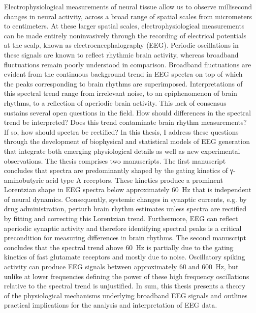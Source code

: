 \documentclass[11pt]{report}
\begin{document}
Electrophysiological measurements of neural tissue allow us to observe millisecond changes in neural activity, across a broad range of spatial scales from micrometers to centimeters. At these larger spatial scales, electrophysiological measurements can be made entirely noninvasively through the recording of electrical potentials at the scalp, known as electroencephalography (EEG). Periodic oscillations in these signals are known to reflect rhythmic brain activity, whereas broadband fluctuations remain poorly understood in comparison. Broadband fluctuations are evident from the continuous background trend in EEG spectra on top of which the peaks corresponding to brain rhythms are superimposed. Interpretations of this spectral trend range from irrelevant noise, to an epiphenomenon of brain rhythms, to a reflection of aperiodic brain activity. This lack of consensus sustains several open questions in the field. How should differences in the spectral trend be interpreted? Does this trend contaminate brain rhythm measurements? If so, how should spectra be rectified? In this thesis, I address these questions through the development of biophysical and statistical models of EEG generation that integrate both emerging physiological details as well as new experimental observations. The thesis comprises two manuscripts. The first manuscript concludes that spectra are predominantly shaped by the gating kinetics of γ-aminobutyric acid type A receptors. These kinetics produce a prominent Lorentzian shape in EEG spectra below approximately \qty{60}{\hertz} that is independent of neural dynamics. Consequently, systemic changes in synaptic currents, e.g. by drug administration, perturb brain rhythm estimates unless spectra are rectified by fitting and correcting this Lorentzian trend. Furthermore, EEG can reflect aperiodic synaptic activity and therefore identifying spectral peaks is a critical precondition for measuring differences in brain rhythms. The second manuscript concludes that the spectral trend above \qty{60}{\hertz} is partially due to the gating kinetics of fast glutamate receptors and mostly due to noise. Oscillatory spiking activity can produce EEG signals between approximately 60 and \qty{600}{\hertz}, but unlike at lower frequencies defining the power of these high frequency oscillations relative to the spectral trend is unjustified. In sum, this thesis presents a theory of the physiological mechanisms underlying broadband EEG signals and outlines practical implications for the analysis and interpretation of EEG data.
\end{document}
